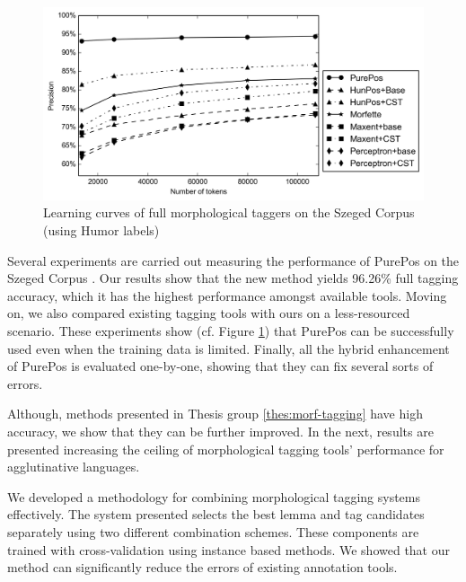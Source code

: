 \begin{figure}[H]
  \centering
  \includegraphics[width=1\textwidth]{MorphTagging/msd_token.png}
  \caption{Learning curves of full morphological taggers on the Szeged Corpus (using Humor labels)}
  \label{fig:humor-token_en}
\end{figure}

Several experiments are carried out measuring the performance of PurePos on the Szeged Corpus \cite{Csendes2004}.
Our results show that the new method yields 96.26\% full tagging accuracy, which it has the highest performance amongst available tools.
Moving on, we also compared existing tagging tools with ours on a less-resourced scenario.
These experiments show (cf. Figure \ref{fig:humor-token_en}) that PurePos can be successfully used even when the training data is limited.
Finally, all the hybrid enhancement of PurePos is evaluated one-by-one, showing that they can fix several sorts of errors.


\thesisline%

Although, methods presented in Thesis group \ref{thes:morf-tagging} have high accuracy, we show that they can be further improved.  
In the next, results are presented increasing the ceiling of morphological tagging tools' performance for agglutinative languages.


\begin{core}
\begin{thesis}
We developed a methodology for combining morphological tagging systems effectively.
The system presented selects the best lemma and tag candidates separately using two different combination schemes.
These components are trained with cross-validation using instance based methods.
We showed that our method can significantly reduce the errors of existing annotation tools.
\end{thesis}

\begin{pub}
\cite{Laki2013a,Orosz2013c,Orosz2013d} 
\end{pub}
\end{core}

